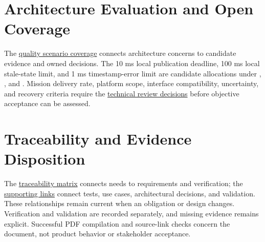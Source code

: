 \section{Architecture Evaluation and Open Coverage}
The \hyperref[Table:QualityScenarioCoverage]{quality scenario coverage}
connects architecture concerns to candidate evidence and owned decisions.
The 10 ms local publication deadline, 100 ms local stale-state limit, and
1 ms timestamp-error limit are candidate allocations under
, , and
. Mission delivery rate, platform scope,
interface compatibility, uncertainty, and recovery criteria require the
\hyperref[Section:ReviewDecisions]{technical review decisions} before
objective acceptance can be assessed.

\section{Traceability and Evidence Disposition}
The \hyperref[Table:TraceabilityMatrix]{traceability matrix} connects needs
to requirements and verification; the
\hyperref[Table:SupportingTraceLinks]{supporting links} connect tests, use
cases, architectural decisions, and validation. These relationships remain
current when an obligation or design changes. Verification and validation
are recorded separately, and missing evidence remains explicit. Successful
PDF compilation and source-link checks concern the document, not product
behavior or stakeholder acceptance.
